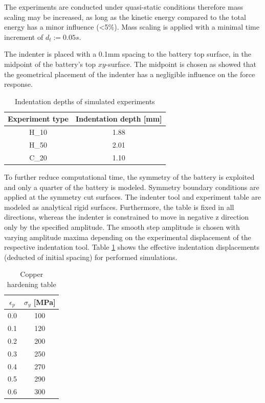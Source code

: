 The experiments are conducted under quasi-static conditions therefore mass scaling may be increased, as long as the kinetic energy compared to the total energy has a minor influence (<5\%). Mass scaling is applied with a minimal time increment of $d_t := 0.05s$.

The indenter is placed with a 0.1mm spacing to the battery top surface, in the midpoint of the battery's top $xy$-surface. The midpoint is chosen as \citet{Tancogne-Ind} showed that the geometrical placement of the indenter has a negligible influence on the force response. 

\begin{table}[ht]
    \centering
    \begin{tabular}{c|c}
        \textbf{Experiment type} &  \textbf{Indentation depth [mm]}\\ \hline
         H\_10 &  1.88 \\ \hline
         H\_50 &  2.01      \\ \hline
         C\_20 &  1.10    \\  \hline
    \end{tabular}
    \caption{Indentation depths of simulated experiments}
    \label{tab:Indentation_depths_of_experiments}
\end{table}

To further reduce computational time, the symmetry of the battery is exploited and only a quarter of the battery is modeled. Symmetry boundary conditions are applied at the symmetry cut surfaces. The indenter tool and experiment table are modeled as analytical rigid surfaces. Furthermore, the table is fixed in all directions, whereas the indenter is constrained to move in negative z direction only by the specified amplitude. The smooth step amplitude is chosen with varying amplitude maxima depending on the experimental displacement of the respective indentation tool. Table \ref{tab:Indentation_depths_of_experiments} shows the effective indentation displacements (deducted of initial spacing) for performed simulations.

\begin{table}[ht]
\centering
\begin{tabular}{|c|c|}
\hline
$\epsilon_p$ & $\sigma_y$ [MPa] \\
\hline
0.0 & 100 \\
0.1 & 120 \\
0.2 & 200 \\
0.3 & 250 \\
0.4 & 270 \\
0.5 & 290 \\
0.6 & 300 \\
\hline
\end{tabular}
\caption{Copper hardening table}
\label{tab:copper_table}
\end{table}


